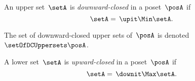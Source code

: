 \begin{comment}
            \item \emph{Transitivity}: One has
            \begin{equation}
                \begin{aligned}
                    \left(A\posAAleq B\right) \wedge \left(B\posAAleq C\right)&\Leftrightarrow  \left(\upit  A \supseteq \ \upit  \ B\right) \wedge \left( \upit   B\supseteq \ \upit  C\right)\\
                    &\Imp \ \upit  A\supseteq \ \upit  C\\
                    &\Imp A\posAAleq C.
                \end{aligned}
            \end{equation}
            In order to find the top, we need to find the smallest set~$\postop_{\posAA}$ such that~$A\posAAleq \postop_{\posAA}$ for all~$A\in \posAA$.
            In other words, such that~$\upit  A\supseteq \ \upit  \postop_{\posAA}$ for all~$A\in \posAA$. This is clearly~$\emptyset$, since~$\upit  \emptyset = \emptyset$.
            Similarly, in order to find the bottom, we need to find the set~$\posbot_{\posAA}$ such that~$\posbot_{\posAA} \posAAleq A$ for all~$A\in \posAA$.
            In other words, such that~$\upit  \posbot_{\posAA} \supseteq \ \upit  A$ for all~$A\in \posAA$.
            We obtain a bottom if we set~$\posbot_{\posAA} \definedas \postop_{\posA}$, since~$\postop_{\posA} \supseteq A$ for all~$A \subseteq P$, and hence, by monotonicity of~$\upit $, we have in particular~$\upit  \postop_{\posA} \supseteq \upit  A$ for all antichains~$A$.
        \end{compactitem}
    \end{proof}
\end{comment}

\begin{definition}
    \label{def:downward-closed-upperset}
    An upper set~$\setA$ is \emph{downward-closed} in a poset~$\posA$ if
    \begin{equation}
        \setA =\, \upit  \Min \setA.
    \end{equation}
\end{definition}

The set of downward-closed upper sets of~$\posA$ is denoted~$\setOfDCUppersets \posA$.

\begin{definition}
    \label{def:upward-closed-lowerset}
    A lower set~$\setA$ is \emph{upward-closed} in a poset~$\posA$ if
    \begin{equation}
        \setA =\, \downit  \Max \setA.
    \end{equation}
\end{definition}

